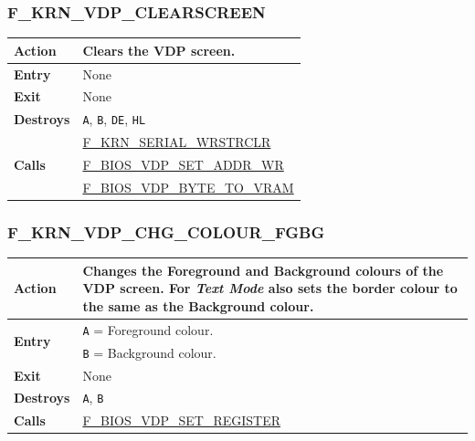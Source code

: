 \documentclass[a4paper,11pt]{article}
\begin{document}
        \subsubsection{F\_KRN\_VDP\_CLEARSCREEN}
        \label{func:fkrnvdpclearscreen}
        \begin{tabular}{l p{9cm}}
            \hline\textbf{Action}
            & Clears the \textbf{VDP} screen. \\
            \hline\textbf{Entry} & None\\
            \hline\textbf{Exit} & None\\
            \hline\textbf{Destroys} & \texttt{A}, \texttt{B}, \texttt{DE},
                \texttt{HL} \\
            \hline\multirow[t]{3}{4em}{\textbf{Calls}}
            & \hyperref[func:fkrnserialwrstrclr]{F\_KRN\_SERIAL\_WRSTRCLR}\\
            & \hyperref[func:fbiosvdpsetaddrwr]{F\_BIOS\_VDP\_SET\_ADDR\_WR}\\
            & \hyperref[func:fbiosvdpbytetovram]{F\_BIOS\_VDP\_BYTE\_TO\_VRAM}\\
            \hline
        \end{tabular}

        \subsubsection{F\_KRN\_VDP\_CHG\_COLOUR\_FGBG}
        \label{func:fkrnvdpchgcolourfgbg}
        \begin{tabular}{l p{9cm}}
            \hline\textbf{Action}
            & Changes the Foreground and Background colours of the \textbf{VDP}
            screen. For \textit{Text Mode} also sets the border colour to the
            same as the Background colour.\\
            \hline\multirow[t]{2}{4em}{\textbf{Entry}}
            & \texttt{A} = Foreground colour.\\
            & \texttt{B} = Background colour.\\
            \hline\textbf{Exit} & None\\
            \hline\textbf{Destroys} & \texttt{A}, \texttt{B}\\
            \hline\textbf{Calls}
            & \hyperref[func:fbiosvdpsetregister]{F\_BIOS\_VDP\_SET\_REGISTER}\\
            \hline
        \end{tabular}
\end{document}
